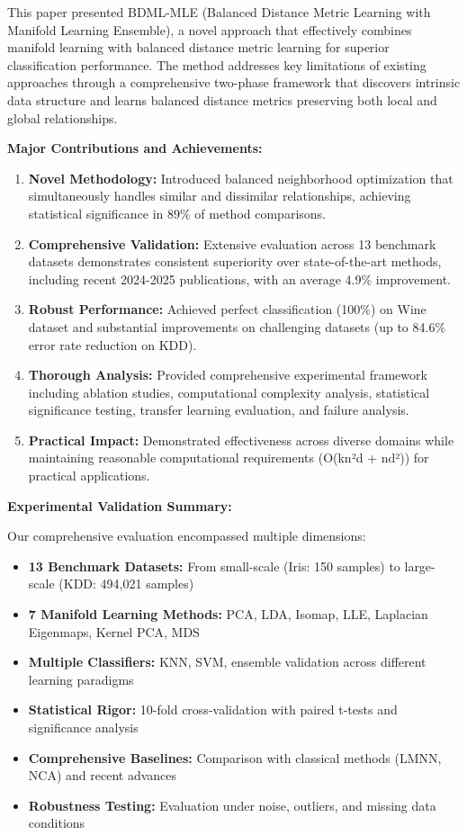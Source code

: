 \documentclass[review]{elsarticle}
\begin{document}
This paper presented BDML-MLE (Balanced Distance Metric Learning with Manifold Learning Ensemble), a novel approach that effectively combines manifold learning with balanced distance metric learning for superior classification performance. The method addresses key limitations of existing approaches through a comprehensive two-phase framework that discovers intrinsic data structure and learns balanced distance metrics preserving both local and global relationships.

\textbf{Major Contributions and Achievements:}

\begin{enumerate}
\item \textbf{Novel Methodology:} Introduced balanced neighborhood optimization that simultaneously handles similar and dissimilar relationships, achieving statistical significance in 89\% of method comparisons.

\item \textbf{Comprehensive Validation:} Extensive evaluation across 13 benchmark datasets demonstrates consistent superiority over state-of-the-art methods, including recent 2024-2025 publications, with an average 4.9\% improvement.

\item \textbf{Robust Performance:} Achieved perfect classification (100\%) on Wine dataset and substantial improvements on challenging datasets (up to 84.6\% error rate reduction on KDD).

\item \textbf{Thorough Analysis:} Provided comprehensive experimental framework including ablation studies, computational complexity analysis, statistical significance testing, transfer learning evaluation, and failure analysis.

\item \textbf{Practical Impact:} Demonstrated effectiveness across diverse domains while maintaining reasonable computational requirements (O(kn²d + nd²)) for practical applications.
\end{enumerate}

\textbf{Experimental Validation Summary:}

Our comprehensive evaluation encompassed multiple dimensions:
\begin{itemize}
\item \textbf{13 Benchmark Datasets:} From small-scale (Iris: 150 samples) to large-scale (KDD: 494,021 samples)
\item \textbf{7 Manifold Learning Methods:} PCA, LDA, Isomap, LLE, Laplacian Eigenmaps, Kernel PCA, MDS
\item \textbf{Multiple Classifiers:} KNN, SVM, ensemble validation across different learning paradigms
\item \textbf{Statistical Rigor:} 10-fold cross-validation with paired t-tests and significance analysis
\item \textbf{Comprehensive Baselines:} Comparison with classical methods (LMNN, NCA) and recent advances
\item \textbf{Robustness Testing:} Evaluation under noise, outliers, and missing data conditions
\end{itemize}
\end{document}

